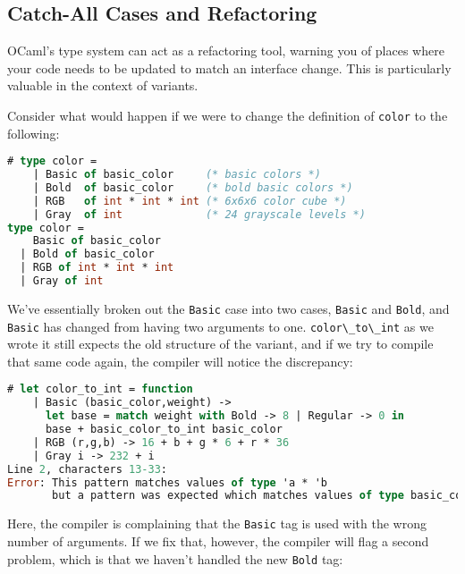 \hypertarget{catch-all-cases-and-refactoring}{%
\subsection{Catch-All Cases and
Refactoring}\label{catch-all-cases-and-refactoring}}

OCaml's type system can act as a refactoring tool, warning you of places
where your code needs to be updated to match an interface change. This
is particularly valuable in the context of variants.

Consider what would happen if we were to change the definition of
\passthrough{\lstinline!color!} to the following:

\begin{lstlisting}[language=Caml]
# type color =
    | Basic of basic_color     (* basic colors *)
    | Bold  of basic_color     (* bold basic colors *)
    | RGB   of int * int * int (* 6x6x6 color cube *)
    | Gray  of int             (* 24 grayscale levels *)
type color =
    Basic of basic_color
  | Bold of basic_color
  | RGB of int * int * int
  | Gray of int
\end{lstlisting}

We've essentially broken out the \passthrough{\lstinline!Basic!} case
into two cases, \passthrough{\lstinline!Basic!} and
\passthrough{\lstinline!Bold!}, and \passthrough{\lstinline!Basic!} has
changed from having two arguments to one.
\passthrough{\lstinline!color\_to\_int!} as we wrote it still expects
the old structure of the variant, and if we try to compile that same
code again, the compiler will notice the discrepancy:

\begin{lstlisting}[language=Caml]
# let color_to_int = function
    | Basic (basic_color,weight) ->
      let base = match weight with Bold -> 8 | Regular -> 0 in
      base + basic_color_to_int basic_color
    | RGB (r,g,b) -> 16 + b + g * 6 + r * 36
    | Gray i -> 232 + i
Line 2, characters 13-33:
Error: This pattern matches values of type 'a * 'b
       but a pattern was expected which matches values of type basic_color
\end{lstlisting}

Here, the compiler is complaining that the
\passthrough{\lstinline!Basic!} tag is used with the wrong number of
arguments. If we fix that, however, the compiler will flag a second
problem, which is that we haven't handled the new
\passthrough{\lstinline!Bold!} tag:

